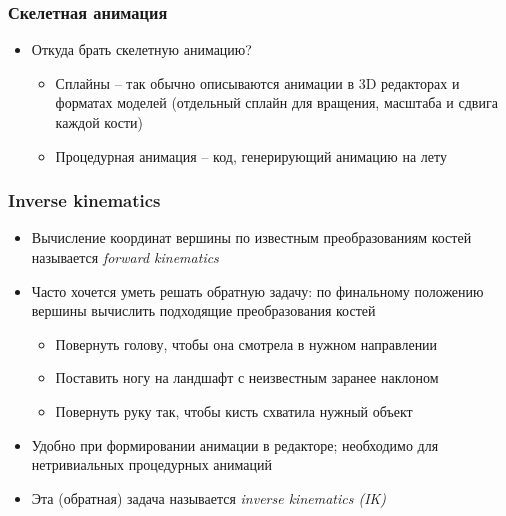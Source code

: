 \documentclass[10pt]{beamer}
\begin{document}
\begin{frame}[fragile]
\frametitle{Скелетная анимация}
\begin{itemize}
\item Откуда брать скелетную анимацию?
\pause
\begin{itemize}
\item Сплайны -- так обычно описываются анимации в 3D редакторах и форматах моделей (отдельный сплайн для вращения, масштаба и сдвига каждой кости)
\pause
\item Процедурная анимация -- код, генерирующий анимацию на лету
\end{itemize}
\end{itemize}
\end{frame}

\begin{frame}[fragile]
\frametitle{Inverse kinematics}
\begin{itemize}
\item Вычисление координат вершины по известным преобразованиям костей называется \textit{forward kinematics}
\pause
\item Часто хочется уметь решать обратную задачу: по финальному положению вершины вычислить подходящие преобразования костей
\pause
\begin{itemize}
\item Повернуть голову, чтобы она смотрела в нужном направлении
\pause
\item Поставить ногу на ландшафт с неизвестным заранее наклоном
\pause
\item Повернуть руку так, чтобы кисть схватила нужный объект
\end{itemize}
\pause
\item Удобно при формировании анимации в редакторе; необходимо для нетривиальных процедурных анимаций
\pause
\item Эта (обратная) задача называется \textit{inverse kinematics (IK)}
\end{itemize}
\end{frame}
\end{document}
